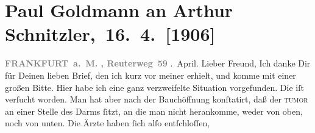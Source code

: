 

         
         \renewcommand{\erwaehntePersonen}{Personen: Paul Kraske, Fedor Mamroth, Josef Rosengart, Julius Schnitzler}
         \renewcommand{\erwaehnteOrte}{Orte: Berlin, Frankfurt am Main, Freiburg im Breisgau, Reuterweg, Wien}
         \renewcommand{\erwaehnteWerke}{}
               \section[ Paul Goldmann an Arthur Schnitzler, 16. 4. {[}1906{]}]{ Paul Goldmann an Arthur Schnitzler, 16. 4. {[}1906{]}}\nopagebreak{}\rehead{ }\begin{ledgroupsized}[t]{13cm}\normalsize\beginnumbering \toendnotes[C]{\smallbreak\pagebreak[2]} 
\toendnotes[C]{\smallbreak}\pstart
           \noindent{}\raggedleft{}{\pb}\textcolor{gray}{\textbf{FRANKFURT a. M. , Reuterweg 59}}\pend
           . April.\pend
           \pstart
           Lieber Freund, Ich danke Dir für Deinen lieben Brief,
               den ich kurz vor meiner \label{K_L03243-11v}\label{K_L03243-11h} erhielt, und komme mit einer großen Bitte.\pend
           \pstart
           Hier habe ich eine ganz
               verzweifelte Situation vorgefunden. Die \label{K-L03243-1v}\label{K-L03243-1h} iſt verſucht worden. Man hat aber nach der Bauchöffnung konſtatirt, daß der
                  \textsc{tumor} an einer Stelle des Darms ſitzt, an die man nicht
               herankomme, weder von oben, noch von unten. Die Ärzte haben ſich alſo entſchloſſen,

\end{ledgroupsized}
